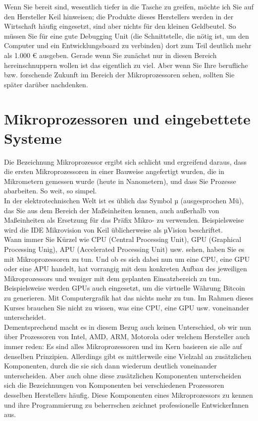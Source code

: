 Wenn Sie bereit sind, wesentlich tiefer in die Tasche zu greifen, möchte ich Sie auf den Hersteller Keil hinweisen; die Produkte dieses Herstellers werden in der Wirtschaft häufig eingesetzt, sind aber nichts für den kleinen Geldbeutel. So müssen Sie für eine gute Debugging Unit (die Schnittstelle, die nötig ist, um den Computer und ein Entwicklungsboard zu verbinden) dort zum Teil deutlich mehr als 1.000 € ausgeben. Gerade wenn Sie zunächst nur in diesen Bereich hereinschnuppern wollen ist das eigentlich zu viel. Aber wenn Sie Ihre berufliche bzw. forschende Zukunft im Bereich der Mikroprozessoren sehen, sollten Sie später darüber nachdenken.\\

\section{Mikroprozessoren und eingebettete Systeme}

Die Bezeichnung Mikroprozessor ergibt sich schlicht und ergreifend daraus, dass die ersten Mikroprozessoren in einer Bauweise angefertigt wurden, die in Mikrometern gemessen wurde (heute in Nanometern), und dass Sie Prozesse abarbeiten. So weit, so simpel.\\

In der elektrotechnischen Welt ist es üblich das Symbol µ  (ausgesprochen Mü), das Sie aus dem Bereich der Maßeinheiten kennen, auch außerhalb von Maßeinheiten als Ersetzung für das Präfix Mikro- zu verwenden. Beispielsweise wird die IDE Mikrovision von Keil üblicherweise als µVision beschriftet.\\

Wann immer Sie Kürzel wie CPU (Central Processing Unit), GPU (Graphical Processing Unig), APU (Accelerated Processing Unit) usw. sehen, haben Sie es mit Mikroprozessoren zu tun. Und ob es sich dabei nun um eine CPU, eine GPU oder eine APU handelt, hat vorrangig mit dem konkreten Aufbau des jeweiligen Mikroprozessors und weniger mit dem geplanten Einsatzbereich zu tun. Beispielsweise werden GPUs auch eingesetzt, um die virtuelle Währung Bitcoin zu generieren. Mit Computergrafik hat das nichts mehr zu tun. Im Rahmen dieses Kurses brauchen Sie nicht zu wissen, was eine CPU, eine GPU usw. voneinander unterscheidet.\\

Dementsprechend macht es in diesem Bezug auch keinen Unterschied, ob wir nun über Prozessoren von Intel, AMD, ARM, Motorola oder welchem Hersteller auch immer reden: Es sind alles Mikroprozessoren und im Kern basieren sie alle auf denselben Prinzipien. Allerdings gibt es mittlerweile eine Vielzahl an zusätzlichen Komponenten, durch die sie sich dann wiederum deutlich voneinander unterscheiden. Aber auch ohne diese zusätzlichen Komponenten unterscheiden sich die Bezeichnungen von Komponenten bei verschiedenen Prozessoren desselben Herstellers häufig. Diese Komponenten eines Mikroprozessors zu kennen und ihre Programmierung zu beherrschen zeichnet professionelle EntwickerInnen aus. \\

